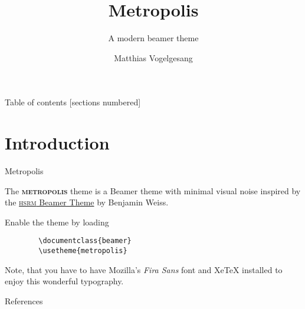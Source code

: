 \documentclass[10pt]{beamer}
\title{Metropolis}
\subtitle{A modern beamer theme}
\date{}
\author{Matthias Vogelgesang}
\institute{Center for modern beamer themes}
\newcommand{\themename}{\textbf{\textsc{metropolis}}\xspace}
\begin{document}
  \maketitle

  \begin{frame}{Table of contents}
    [sections numbered]
    \tableofcontents[hideallsubsections]
  \end{frame}

  \section{Introduction}

    \begin{frame}[fragile]{Metropolis}

      The \themename theme is a Beamer theme with minimal visual noise
      inspired by the \href{https://github.com/hsrmbeamertheme/hsrmbeamertheme}{\textsc{hsrm} Beamer
      Theme} by Benjamin Weiss.

      Enable the theme by loading

      \begin{verbatim}
        \documentclass{beamer}
        \usetheme{metropolis}
      \end{verbatim}

      Note, that you have to have Mozilla's \emph{Fira Sans} font and XeTeX
      installed to enjoy this wonderful typography.
    \end{frame}

    \begin{frame}[allowframebreaks]{References}

      
      

    \end{frame}
\end{document}
